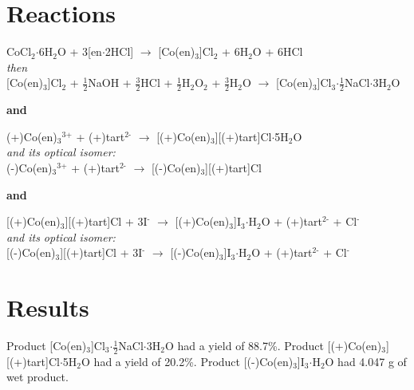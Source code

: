 \documentclass[11pt]{article}
\newcommand{\super}[1]{\ensuremath{^{\textrm{#1}}}}
\newcommand{\sub}[1]{\ensuremath{_{\textrm{#1}}}}
\begin{document}
\section{Reactions\cite{lab}}
\begin{center}
CoCl\sub{2}$\cdot$6H\sub{2}O + 3[en$\cdot$2HCl] $\rightarrow$ [Co(en)\sub{3}]Cl\sub{2} + 6H\sub{2}O + 6HCl \\
\textit{then} \\

[Co(en)\sub{3}]Cl\sub{2} + $\frac{1}{2}$NaOH + $\frac{3}{2}$HCl + $\frac{1}{2}$H\sub{2}O\sub{2} + $\frac{3}{2}$H\sub{2}O $\rightarrow$ [Co(en)\sub{3}]Cl\sub{3}$\cdot \frac{1}{2}$NaCl$\cdot$3H\sub{2}O \bigskip

\textbf{and} \bigskip

(+)Co(en)\sub{3}\super{3+} + (+)tart\super{2-} $\rightarrow$ [(+)Co(en)\sub{3}][(+)tart]Cl$\cdot$5H\sub{2}O \\
\textit{and its optical isomer:} \\
(-)Co(en)\sub{3}\super{3+} + (+)tart\super{2-} $\rightarrow$ [(-)Co(en)\sub{3}][(+)tart]Cl \bigskip

\textbf{and} \bigskip

[(+)Co(en)\sub{3}][(+)tart]Cl + 3I\super{-} $\rightarrow$ [(+)Co(en)\sub{3}]I\sub{3}$\cdot$H\sub{2}O + (+)tart\super{2-} + Cl\super{-} \\
\textit{and its optical isomer:} \\

[(-)Co(en)\sub{3}][(+)tart]Cl + 3I\super{-} $\rightarrow$ [(-)Co(en)\sub{3}]I\sub{3}$\cdot$H\sub{2}O + (+)tart\super{2-} + Cl\super{-} \\

\end{center}




\section{Results}
Product [Co(en)\sub{3}]Cl\sub{3}$\cdot \frac{1}{2}$NaCl$\cdot$3H\sub{2}O had a yield of 88.7\%. Product [(+)Co(en)\sub{3}][(+)tart]Cl$\cdot$5H\sub{2}O had a yield of 20.2\%. Product [(-)Co(en)\sub{3}]I\sub{3}$\cdot$H\sub{2}O had 4.047 g of wet product. \\
\end{document}
